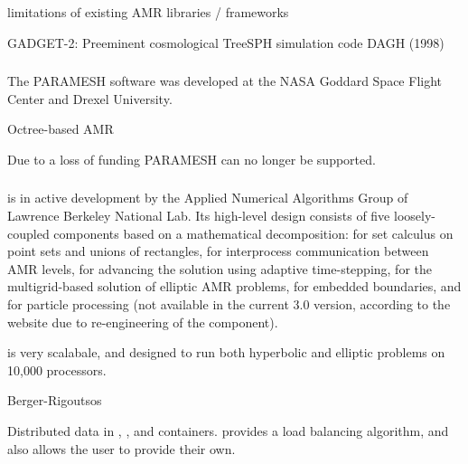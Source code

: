 \documentclass[14pt,letter]{article}
\begin{document}
limitations of existing AMR libraries / frameworks

GADGET-2: Preeminent cosmological TreeSPH simulation code
DAGH (1998)

\subsubsection{} \label{sss:paramesh}

\nocite{wwwparamesh}
\nocite{MaOl00} %
\nocite{OlMa05}
\nocite{Ol06}

The PARAMESH software was developed at the NASA Goddard Space Flight
Center and Drexel University.

Octree-based AMR


Due to a loss of funding PARAMESH can no longer be supported.

\subsubsection{} \label{sss:chombo}

\nocite{wwwchombo}
\nocite{CoGr09}

 is in active development by the Applied Numerical Algorithms
Group of Lawrence Berkeley National Lab.  Its high-level design
consists of five loosely-coupled components based on a mathematical
decomposition:  for set calculus on point sets and
unions of rectangles,  for interprocess communication
between AMR levels,  for advancing the solution
using adaptive time-stepping,  for the
multigrid-based solution of elliptic AMR problems,  for
embedded boundaries, and  for particle processing
(not available in the current 3.0 version, according to the website
due to re-engineering of the component).

 is very scalabale, and designed to run both hyperbolic and
elliptic problems on 10,000 processors.

Berger-Rigoutsos 

Distributed data in , , and
 containers.   provides a load balancing
algorithm, and also allows the user to provide their own.
\end{document}
